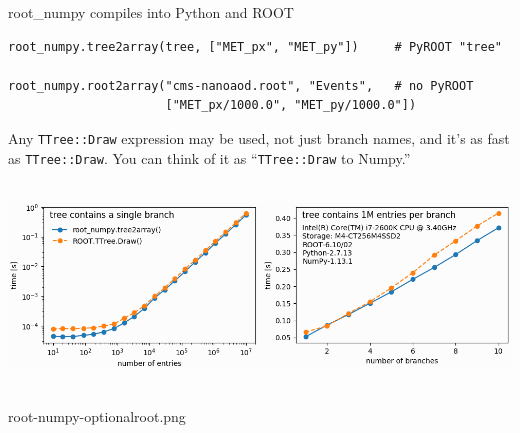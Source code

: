 \documentclass[aspectratio=169]{beamer}
\begin{document}
\begin{frame}[fragile]{root\_numpy compiles into Python and ROOT}
\vspace{0.25 cm}
\small
\begin{verbatim}
root_numpy.tree2array(tree, ["MET_px", "MET_py"])     # PyROOT "tree"

root_numpy.root2array("cms-nanoaod.root", "Events",   # no PyROOT
                      ["MET_px/1000.0", "MET_py/1000.0"])
\end{verbatim}
\large

\vspace{0.25 cm}
Any {\tt TTree::Draw} expression may be used, not just branch names, and it's as fast as {\tt TTree::Draw}. You can think of it as ``{\tt TTree::Draw} to Numpy.''

\vspace{0.25 cm}
\mbox{ } \hfill \includegraphics[width=0.8\linewidth]{root-numpy-fast.png} \hfill \mbox{ }
\end{frame}

root-numpy-optionalroot.png
\end{document}
